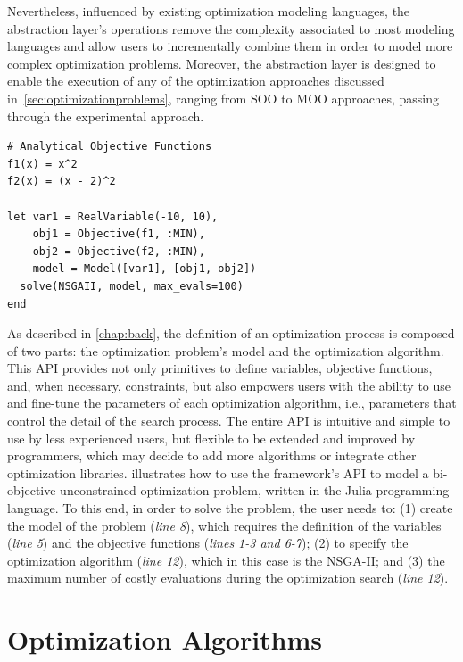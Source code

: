 Nevertheless, influenced by existing optimization modeling languages, the abstraction layer's operations remove the complexity associated to most modeling languages and allow users to incrementally combine them in order to model more complex optimization problems. Moreover, the abstraction layer is designed to enable the execution of any of the optimization approaches discussed in~\cref{sec:optimizationproblems}, ranging from \ac{SOO} to \ac{MOO} approaches, passing through the experimental approach.

\begin{lstlisting}[caption={Simple example of the framework's API being used in a script written in the Julia programming language.},label=juliaCode]
# Analytical Objective Functions
f1(x) = x^2
f2(x) = (x - 2)^2

let var1 = RealVariable(-10, 10),
	obj1 = Objective(f1, :MIN),
	obj2 = Objective(f2, :MIN),
	model = Model([var1], [obj1, obj2])
  solve(NSGAII, model, max_evals=100) 
end
\end{lstlisting}

As described in \cref{chap:back}, the definition of an optimization process is composed of two parts: the optimization problem's model and the optimization algorithm. This \ac{API} provides not only primitives to define variables, objective functions, and, when necessary, constraints, but also empowers users with the ability to use and fine-tune the parameters of each optimization algorithm, i.e., parameters that control the detail of the search process. The entire \ac{API} is intuitive and simple to use by less experienced users, but flexible to be extended and improved by programmers, which may decide to add more algorithms or integrate other optimization libraries.  illustrates how to use the framework's \ac{API} to model a bi-objective unconstrained optimization problem, written in the Julia programming language. To this end, in order to solve the problem, the user needs to: (1) create the model of the problem (\textit{line 8}), which requires the definition of the variables (\textit{line 5}) and the objective functions (\textit{lines 1-3 and 6-7}); (2) to specify the optimization algorithm (\textit{line 12}), which in this case is the \ac{NSGA-II}; and (3) the maximum number of costly evaluations during the optimization search (\textit{line 12}).


\section{Optimization Algorithms}
\label{sec:optalgos}

